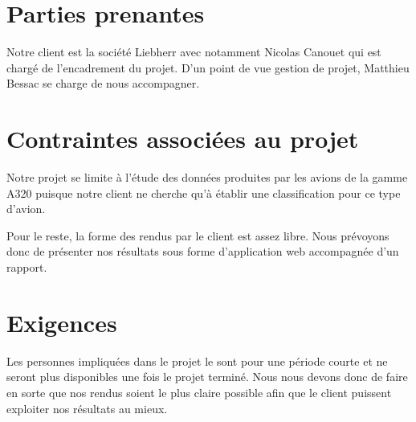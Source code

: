 \section*{Parties prenantes}
Notre client est la société Liebherr avec notamment Nicolas Canouet qui est chargé de l'encadrement du projet. D'un point de vue gestion de projet, Matthieu Bessac se charge de nous accompagner.

\section*{Contraintes associées au projet}
Notre projet se limite à l'étude des données produites par les avions de la gamme A320 puisque notre client ne cherche qu'à établir une classification pour ce type d'avion.

Pour le reste, la forme des rendus par le client est assez libre. Nous prévoyons donc de présenter nos résultats sous forme d'application web accompagnée d'un rapport.

\section*{Exigences}
Les personnes impliquées dans le projet le sont pour une période courte et ne seront plus disponibles une fois le projet terminé. Nous nous devons donc de faire en sorte que nos rendus soient le plus claire possible afin que le client puissent exploiter nos résultats au mieux. 


